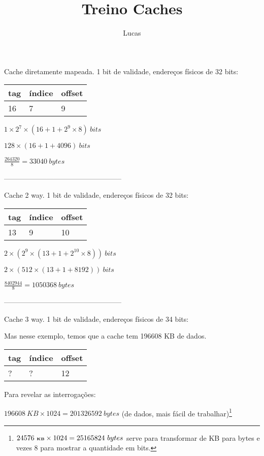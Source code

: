 \documentclass[11pt,twocolumn]{article}
\author{Lucas}
\title{Treino Caches}
\begin{document}
\maketitle

Cache diretamente mapeada. 1 bit de validade, endereços físicos de 32 bits:

\begin{tabular}{|l|l|l|}
\hline tag & índice & offset \\ 
\hline 16 & 7 & 9 \\ 
\hline 
\end{tabular}


$1 \times 2^{7} \times (16 + 1 + 2^{9} \times 8)\ bits$

$128 \times (16+1+4096)\ bits$

$\frac{264320}{8}=33040\ bytes$

--------------------------------------------------

Cache 2 way. 1 bit de validade, endereços físicos de 32 bits:

\begin{tabular}{|l|l|l|}
\hline tag & índice & offset \\ 
\hline 13 & 9 & 10 \\ 
\hline 
\end{tabular}


$2\times(2^{9}\times(13+1+2^{10}\times8))\ bits$

$2\times(512\times(13+1+8192))\ bits$

$\frac{8402944}{8}=1050368\ bytes$

--------------------------------------------------

Cache 3 way. 1 bit de validade, endereços físicos de 34 bits:

Mas nesse exemplo, temos que a cache tem 196608 KB de dados.

\begin{tabular}{|l|l|l|}
\hline tag & índice & offset \\
\hline ? & ? & 12 \\
\hline
\end{tabular}


Para revelar as interrogações:

$196608\ KB \times 1024 = 201326592\ bytes$ (de dados, mais fácil de
trabalhar)\footnote{$24576\ \textbf{\tiny KB} \times 1024 = 25165824\ bytes$
serve para transformar de KB para bytes e vezes 8 para mostrar a quantidade em
bits.}
\end{document}
